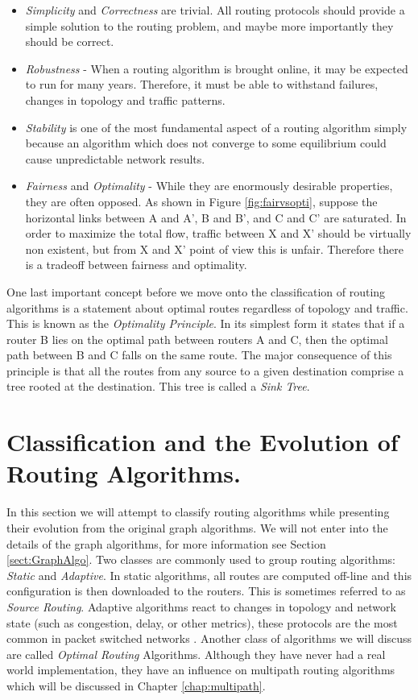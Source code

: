 \begin{itemize}
 \item \textit{Simplicity} and \textit{Correctness} are trivial. All routing protocols should provide a simple solution to the routing problem, and maybe more importantly they should be correct.
 \item \textit{Robustness} - When a routing algorithm is brought online, it may be expected to run for many years. Therefore, it must be able to withstand failures, changes in topology and traffic patterns.
 \item \textit{Stability} is one of the most fundamental aspect of a routing algorithm simply because an algorithm which does not converge to some equilibrium could cause unpredictable network results.
 \item \textit{Fairness} and \textit{Optimality} - While they are enormously desirable properties, they are often opposed. As shown in Figure \ref{fig:fairvsopti}, suppose the horizontal links between A and A', B and B', and C and C' are saturated. In order to maximize the total flow, traffic between X and X' should be virtually non existent, but from X and X' point of view this is unfair. Therefore there is a tradeoff between fairness and optimality. 
\end{itemize}


One last important concept before we move onto the classification of routing algorithms is a statement about optimal routes regardless of topology and traffic. This is known as the \textit{Optimality Principle}. In its simplest form it states that if a router B lies on the optimal path between routers A and C, then the optimal path between B and C falls on the same route. The major consequence of this principle is that all the routes from any source to a given destination comprise a tree rooted at the destination. This tree is called a \textit{Sink Tree}.

\section{Classification and the Evolution of Routing Algorithms.}

In this section we will attempt to classify routing algorithms while presenting their evolution from the original graph algorithms. We will not enter into the details of the graph algorithms, for more information see Section \ref{sect:GraphAlgo}.  Two classes are commonly used to group routing algorithms: \textit{Static} and \textit{Adaptive}. In static algorithms, all routes are computed off-line and this configuration is then downloaded to the routers. This is sometimes referred to as \textit{Source Routing}. Adaptive algorithms react to changes in topology and network state (such as congestion, delay, or other metrics), these protocols are the most common in packet switched networks \cite{DataNetworks}. Another class of algorithms we will discuss are called \textit{Optimal Routing} Algorithms. Although they have never had a real world implementation, they have an influence on multipath routing algorithms which will be discussed in Chapter \ref{chap:multipath}.
 
